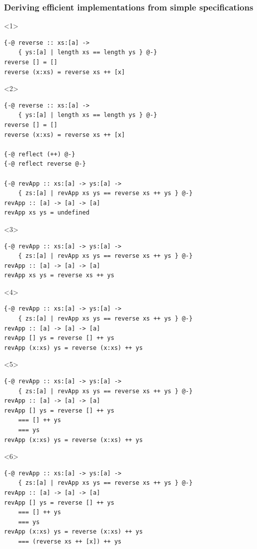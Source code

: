 \documentclass{beamer}
\begin{document}
\begin{frame}[fragile]
\frametitle{Deriving efficient implementations from simple specifications}

\begin{onlyenv}<1>
\begin{verbatim}
{-@ reverse :: xs:[a] ->
    { ys:[a] | length xs == length ys } @-}
reverse [] = []
reverse (x:xs) = reverse xs ++ [x]
\end{verbatim}
\end{onlyenv}

\begin{onlyenv}<2>
\begin{verbatim}
{-@ reverse :: xs:[a] ->
    { ys:[a] | length xs == length ys } @-}
reverse [] = []
reverse (x:xs) = reverse xs ++ [x]

{-@ reflect (++) @-}
{-@ reflect reverse @-}

{-@ revApp :: xs:[a] -> ys:[a] ->
    { zs:[a] | revApp xs ys == reverse xs ++ ys } @-}
revApp :: [a] -> [a] -> [a]
revApp xs ys = undefined
\end{verbatim}
\end{onlyenv}

\begin{onlyenv}<3>
\begin{verbatim}
{-@ revApp :: xs:[a] -> ys:[a] ->
    { zs:[a] | revApp xs ys == reverse xs ++ ys } @-}
revApp :: [a] -> [a] -> [a]
revApp xs ys = reverse xs ++ ys
\end{verbatim}
\end{onlyenv}

\begin{onlyenv}<4>
\begin{verbatim}
{-@ revApp :: xs:[a] -> ys:[a] ->
    { zs:[a] | revApp xs ys == reverse xs ++ ys } @-}
revApp :: [a] -> [a] -> [a]
revApp [] ys = reverse [] ++ ys
revApp (x:xs) ys = reverse (x:xs) ++ ys
\end{verbatim}
\end{onlyenv}

\begin{onlyenv}<5>
\begin{verbatim}
{-@ revApp :: xs:[a] -> ys:[a] ->
    { zs:[a] | revApp xs ys == reverse xs ++ ys } @-}
revApp :: [a] -> [a] -> [a]
revApp [] ys = reverse [] ++ ys
    === [] ++ ys
    === ys
revApp (x:xs) ys = reverse (x:xs) ++ ys
\end{verbatim}
\end{onlyenv}

\begin{onlyenv}<6>
\begin{verbatim}
{-@ revApp :: xs:[a] -> ys:[a] ->
    { zs:[a] | revApp xs ys == reverse xs ++ ys } @-}
revApp :: [a] -> [a] -> [a]
revApp [] ys = reverse [] ++ ys
    === [] ++ ys
    === ys
revApp (x:xs) ys = reverse (x:xs) ++ ys
    === (reverse xs ++ [x]) ++ ys
\end{verbatim}
\end{onlyenv}


\end{frame}
\end{document}
